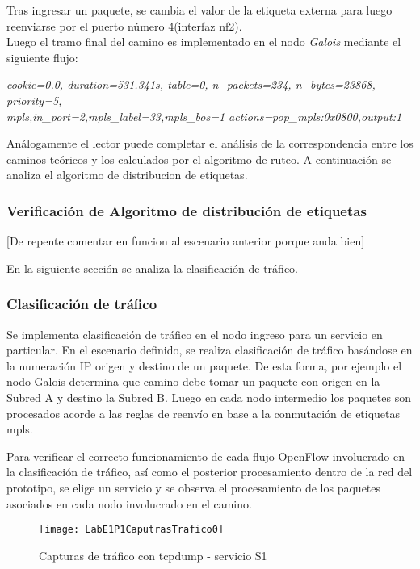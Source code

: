 Tras ingresar un paquete, se cambia el valor de la etiqueta externa para luego reenviarse por el puerto n\'umero 4(interfaz nf2).\\

Luego el tramo final del camino es implementado en el nodo \textit{Galois} mediante el siguiente flujo:

\begin{center}
\textit{cookie=0.0, duration=531.341s, table=0, n\_packets=234, n\_bytes=23868, priority=5, \\
mpls,in\_port=2,mpls\_label=33,mpls\_bos=1 actions=pop\_mpls:0x0800,output:1 }
\end{center}

Análogamente el lector puede completar el análisis de la correspondencia entre los caminos te\'oricos y los calculados por el algoritmo de ruteo. A continuaci\'on se analiza el algoritmo de distribucion de etiquetas.

\subsubsection{Verificaci\'on de Algoritmo de distribución de etiquetas}

[De repente comentar en funcion al escenario anterior porque anda bien]

En la siguiente secci\'on se analiza la clasificaci\'on de tr\'afico.

\subsubsection{Clasificaci\'on de tr\'afico}
Se implementa clasificaci\'on de tr\'afico en el nodo ingreso para un servicio en particular. En el escenario definido, se realiza clasificaci\'on de tr\'afico basándose en la numeraci\'on IP origen y destino de un paquete. De esta forma, por ejemplo el nodo Galois determina que camino debe tomar un paquete con origen en la Subred A y destino la Subred B. Luego en cada nodo intermedio los paquetes son procesados acorde a las reglas de reenvío en base a la conmutación de etiquetas mpls.

Para verificar el correcto funcionamiento de cada flujo OpenFlow involucrado en la clasificaci\'on de tr\'afico, as\'i como el posterior procesamiento dentro de la red del prototipo, se elige un servicio y se observa el procesamiento de los paquetes asociados en cada nodo involucrado en el camino.\\

\begin{figure}[ht!] 
\centering    
\texttt{[image: LabE1P1CaputrasTrafico0]}
\caption[Capturas de tr\'afico con tcpdump - servicio S1]{Capturas de tr\'afico con tcpdump - servicio S1}
\label{fig:LabE1P1CapsTraf}
\end{figure}

